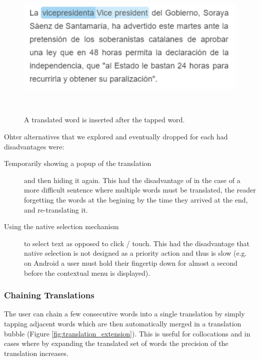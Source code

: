 \begin{figure}[h!]
\centering
  \includegraphics[width=0.8\columnwidth]{figures/translated_word}
  \caption{A translated word is inserted after the tapped word.}~\label{fig:translated_word}
\end{figure}

Ohter alternatives that we explored and eventually dropped for each had disadvantages were: 
\begin{description}

  \item [Temporarily showing a popup of the translation] and then hiding it again. This had the disadvantage of in the case of a more difficult sentence where multiple words must be translated, the reader forgetting the words at the begining by the time they arrived at the end, and re-translating it. 

  \item [Using the native selection mechanism] to select text as opposed to click / touch. 
  This had the disadvantage that native selection is not designed as a priority action and thus is slow (e.g. on Android a user must hold their fingertip down for almost a second before the contextual menu is displayed). 
\end{description}


\subsubsection{Chaining Translations}

The user can chain a few consecutive words into a single translation by simply tapping adjacent words which are then automatically merged in a translation bubble (Figure \ref{fig:translation_extension}). This is useful for collocations and in cases where by expanding the translated set of words the precision of the translation increases. 


